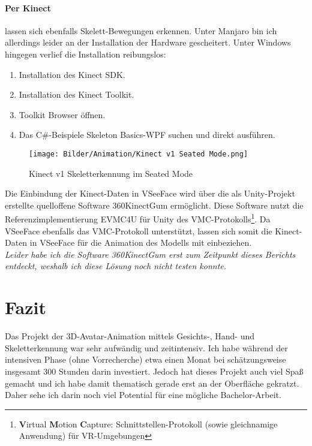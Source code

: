 \documentclass[a4paper, 12pt]{article}
\begin{document}
\paragraph{Per Kinect} lassen sich ebenfalls Skelett-Bewegungen erkennen.
Unter Manjaro\cite{manjaro} bin ich allerdings leider an der Installation der Hardware gescheitert.
Unter Windows\cite{win10} hingegen verlief die Installation reibungslos:
\begin{enumerate}
    \item Installation des Kinect SDK\cite{kinect-sdk}.
    \item Installation des Kinect Toolkit\cite{kinect-toolkit}.
    \item Toolkit Browser öffnen.
    \item Das C\#-Beispiele \glqq{}Skeleton Basics-WPF\grqq{} suchen und direkt ausführen.
\end{enumerate}
\begin{figure}[htbp]
    \centering
    \texttt{[image: Bilder/Animation/Kinect v1 Seated Mode.png]}
    \caption{Kinect v1 Skeletterkennung im \glqq{}Seated Mode\grqq{}}
\end{figure}
Die Einbindung der Kinect-Daten in VSeeFace\cite{vseeface} wird über die
als Unity\cite{unity}-Projekt erstellte quelloffene Software 360KinectGum\cite{360-kinect-gum} ermöglicht.
Diese Software nutzt die Referenzimplementierung EVMC4U\cite{evmc4u} für Unity\cite{unity}
des VMC-Protokolls\footnote{\textbf{V}irtual \textbf{M}otion \textbf{C}apture: Schnittstellen-Protokoll (sowie gleichnamige Anwendung\cite{vmc}) für VR-Umgebungen\cite{vmc-protocol-page}}.
Da VSeeFace\cite{vseeface} ebenfalls das VMC-Protokoll\cite{vmc-protocol-page} unterstützt,
lassen sich somit die Kinect-Daten in VSeeFace\cite{vseeface} für die Animation des Modells mit einbeziehen.
\\\textit{Leider habe ich die Software 360KinectGum\cite{360-kinect-gum}
erst zum Zeitpunkt dieses Berichts entdeckt, weshalb ich diese Lösung noch nicht testen konnte.}
\newpage

\section{Fazit}
\label{sec:conclusion}
Das Projekt der 3D-Avatar-Animation mittels Gesichts-, Hand- und Skeletterkennung war sehr aufwändig und zeitintensiv.
Ich habe während der intensiven Phase (ohne Vorrecherche) etwa einen Monat bei schätzungsweise insgesamt 300 Stunden darin investiert.
Jedoch hat dieses Projekt auch viel Spaß gemacht und ich habe damit thematisch gerade erst an der Oberfläche gekratzt.
Daher sehe ich darin noch viel Potential für eine mögliche Bachelor-Arbeit.
\end{document}
